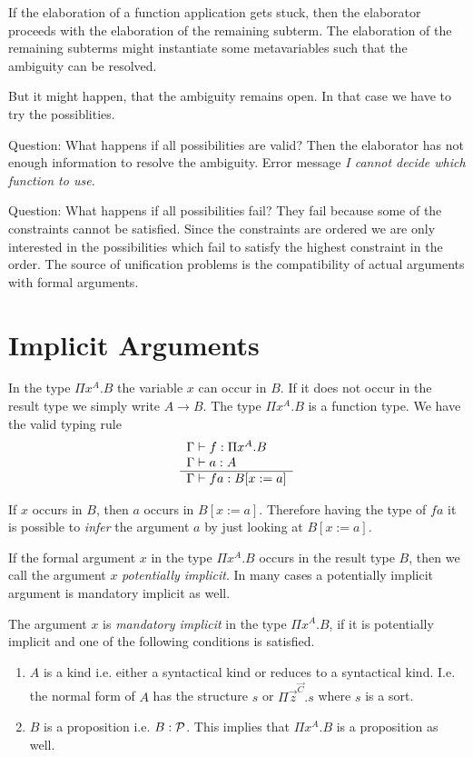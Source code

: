 If the elaboration of a function application gets stuck, then the elaborator
proceeds with the elaboration of the remaining subterm. The elaboration of the
remaining subterms might instantiate some metavariables such that the ambiguity
can be resolved.

But it might happen, that the ambiguity remains open. In that case we have to
try the possiblities.

Question: What happens if all possibilities are valid? Then the elaborator has
not enough information to resolve the ambiguity. Error message \emph{I cannot
decide which function to use.}

Question: What happens if all possibilities fail? They fail because some of the
constraints cannot be satisfied. Since the constraints are ordered we are only
interested in the possibilities which fail to satisfy the highest constraint in
the order. The source of unification problems is the compatibility of actual
arguments with formal arguments.






\section{Implicit Arguments}


In the type $\Pi x^A. B$ the variable $x$ can occur in $B$. If it does not occur
in the result type we simply write $A \to B$. The type $\Pi x^A. B$ is a
function type. We have the valid typing rule
$$
\rulev{
    \Gamma \vdash f: \Pi x^A. B

    \\

    \Gamma \vdash a: A
}
{
    \Gamma \vdash f a: B[x:= a]
}
$$

If $x$ occurs in $B$, then $a$ occurs in $B[x:=a]$. Therefore having the type of
$f a$ it is possible to \emph{infer} the argument $a$ by just looking at
$B[x:=a]$.


If the formal argument $x$ in the type $\Pi x^A. B$ occurs in the result type
$B$, then we call the argument $x$ \emph{potentially implicit}. In many cases a
potentially implicit argument is mandatory implicit as well.

The argument $x$ is \emph{mandatory implicit} in the type $\Pi x^A. B$, if it is
potentially implicit and one of the following conditions is satisfied.

\begin{enumerate}

\item
    $A$ is a kind i.e. either a syntactical kind or reduces to a syntactical
        kind. I.e. the normal form of $A$ has the structure $s$ or $\Pi
        \vec{z}^\vec{C}.  s$ where $s$ is a sort.


\item
    $B$ is a proposition i.e. $B: {\cal{P}}$. This implies that $\Pi x^A. B$ is a
        proposition as well.

\end{enumerate}


